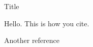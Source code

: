 \documentclass{article}
\begin{document}
	
   Title
   
   Hello. This is how you cite. \cite{gustafsson2016best}
   
   Another reference \cite{hamid2015surface}
   
   

      
    
\end{document}
